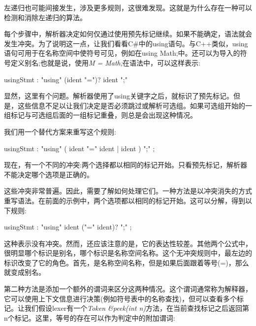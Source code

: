 左递归也可能间接发生，涉及更多规则，这很难发现。这就是为什么存在一种可以检测和消除左递归的算法。\par

每个步骤中，解析器决定如何仅通过使用预先标记继续。如果不能确定，语法就会发生冲突。为了说明这一点，让我们看看C\#中的using语句。与C++类似，using语句可用于在名称空间中使符号可见，例如在using Math;中。还可以为导入的符号定义别名;也就是说，使用\textit{M = Math;}在语法中，可以这样表示:\par

\begin{tcolorbox}[colback=white,colframe=black]
usingStmt : "using" (ident "=")? ident ";"
\end{tcolorbox}

显然，这里有个问题。解析器使用了using关键字之后，就标识了预先标记。但是，这些信息不足以让我们决定是否必须跳过或解析可选组。如果可选组开始的一组标记与可选组后面的一组标记重叠，则总是会出现这种情况。\par

我们用一个替代方案来重写这个规则:\par


\begin{tcolorbox}[colback=white,colframe=black]
usingStmt : "using" ( ident "=" ident | ident ) ";" ;
\end{tcolorbox}

现在，有一个不同的冲突:两个选择都以相同的标记开始。只看预先标记，解析器不能决定哪个选项是正确的。\par

这些冲突非常普遍。因此，需要了解如何处理它们。一种方法是以冲突消失的方式重写语法。在前面的示例中，两个选项都以相同的标记开始。这可以分解，得到以下规则:\par

\begin{tcolorbox}[colback=white,colframe=black]
usingStmt : "using" ident ("=" ident)? ";" ;
\end{tcolorbox}

这种表示没有冲突。然而，还应该注意的是，它的表达性较差。其他两个公式中，很明显哪个标识是别名，哪个标识是名称空间名称。这个无冲突规则中，最左边的标识改变了它的角色。首先，是名称空间名称，但是如果后面跟着等号(=)，那么就变成别名。\par

第二种方法是添加一个额外的谓词来区分这两种情况。这个谓词通常称为解释器，它可以使用上下文信息进行决策(例如符号表中的名称查找)，但可以查看多个标记。让我们假设lexer有一个\textit{Token \&peek(int n)}方法，在当前查找标记之后返回第n个标记。这里，等号的存在可以作为判定中的附加谓词:\par

